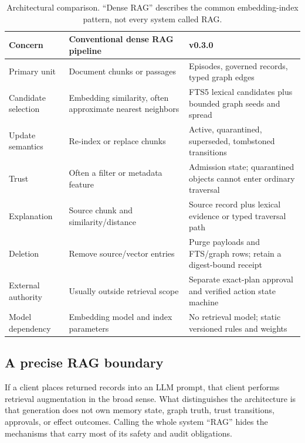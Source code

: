 \begin{table}[t]
\centering
\caption{Architectural comparison. ``Dense RAG'' describes the common embedding-index pattern, not every system called RAG.}
\label{tab:rag-comparison}
\small
\begin{tabularx}{\textwidth}{@{}p{}YY@{}}
\toprule
Concern & Conventional dense RAG pipeline & \system{} v0.3.0 \\
\midrule
Primary unit & Document chunks or passages & Episodes, governed records, typed graph edges \\
Candidate selection & Embedding similarity, often approximate nearest neighbors & FTS5 lexical candidates plus bounded graph seeds and spread \\
Update semantics & Re-index or replace chunks & Active, quarantined, superseded, tombstoned transitions \\
Trust & Often a filter or metadata feature & Admission state; quarantined objects cannot enter ordinary traversal \\
Explanation & Source chunk and similarity/distance & Source record plus lexical evidence or typed traversal path \\
Deletion & Remove source/vector entries & Purge payloads and FTS/graph rows; retain a digest-bound receipt \\
External authority & Usually outside retrieval scope & Separate exact-plan approval and verified action state machine \\
Model dependency & Embedding model and index parameters & No retrieval model; static versioned rules and weights \\
\bottomrule
\end{tabularx}
\end{table}

\subsection{A precise RAG boundary}

If a client places returned \system{} records into an LLM prompt, that client performs retrieval augmentation in the broad sense. What distinguishes the architecture is that generation does not own memory state, graph truth, trust transitions, approvals, or effect outcomes. Calling the whole system ``RAG'' hides the mechanisms that carry most of its safety and audit obligations.
